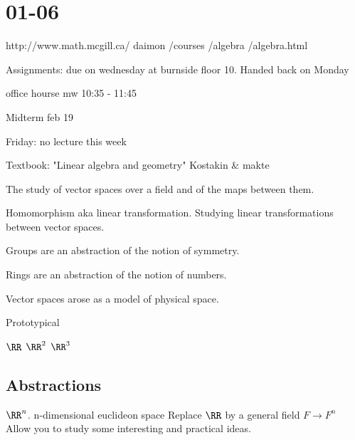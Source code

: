 \documentclass[class=scrartcl, crop=false]{standalone}
\date{2020-01-06}
\begin{document}
\section{01-06}

http://www.math.mcgill.ca/ daimon /courses /algebra /algebra.html

Assignments: due on wednesday at burnside floor 10. Handed back on Monday

office hourse mw 10:35 - 11:45

Midterm feb 19

Friday: no lecture this week

Textbook: "Linear algebra and geometry" Kostakin \& makte

\begin{definition}
  The study of vector spaces over a field and of the maps between them.

  Homomorphism aka linear transformation. Studying linear transformations between vector spaces.
\end{definition} 

Groups are an abstraction of the notion of symmetry.

Rings are an abstraction of the notion of numbers.

Vector spaces arose as a model of physical space.

\begin{example}
  Prototypical
  \begin{enumerate}
    \ii
    $\RR$
    \ii
    $\RR^2$ 
    \ii
    $\RR^3$
  \end{enumerate} 
\end{example} 

\subsection{Abstractions}

\begin{enumerate}
  \ii
  $\RR^n$. n-dimensional euclideon space
  \ii
  Replace $\RR$ by a general field $F \to F^n$ 
  \\
  Allow you to study some interesting and practical ideas.
\end{enumerate} 
\end{document}
